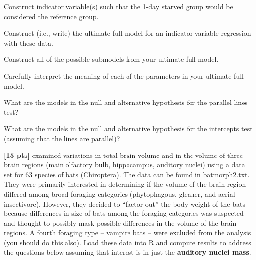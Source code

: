 \documentclass[10pt,openany]{book}\usepackage[]{graphicx}\usepackage[]{color}
\begin{document}
\begin{hwsection}
    \begin{Enumerate}
      \item Construct indicator variable(s) such that the 1-day starved group would be considered the reference group.
      \item Construct (i.e., write) the ultimate full model for an indicator variable regression with these data.
      \item Construct all of the possible submodels from your ultimate full model.
      \item Carefully interpret the meaning of each of the parameters in your ultimate full model.
      \item What are the models in the null and alternative hypothesis for the parallel lines test?
      \item What are the models in the null and alternative hypothesis for the intercepts test (assuming that the lines are parallel)?
    \end{Enumerate}


  \item \label{hwprob:LMIVRBatMorph} \textbf{[15 pts]} \cite{Hutcheonetal2002} examined variations in total brain volume and in the volume of three brain regions (main olfactory bulb, hippocampus, auditory nuclei) using a data set for 63 species of bats (Chiroptera).  The data can be found in \href{https://sites.google.com/site/ncstats/data/Batmorph2.txt}{batmorph2.txt}.  They were primarily interested in determining if the volume of the brain region differed among broad foraging categories (phytophagous, gleaner, and aerial insectivore).  However, they decided to ``factor out'' the body weight of the bats because differences in size of bats among the foraging categories was suspected and thought to possibly mask possible differences in the volume of the brain regions.  A fourth foraging type -- vampire bats -- were excluded from the analysis (you should do this also).  Load these data into R and compute results to address the questions below assuming that interest is in just the \textbf{auditory nuclei mass}.


\end{hwsection}
\end{document}
